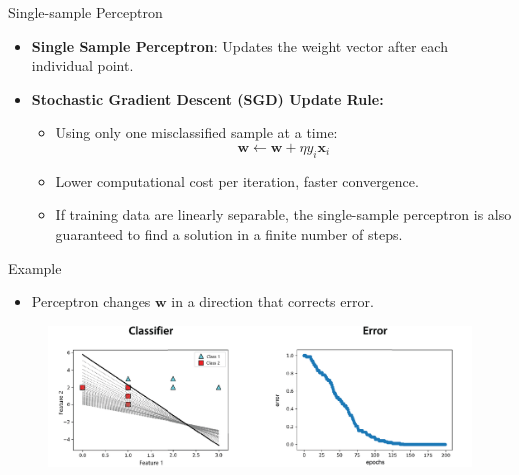 \documentclass[serif, aspectratio=169]{beamer}
\begin{document}
\begin{frame}{Single-sample Perceptron}
    \begin{itemize}\itemsep1.5em
        \item \justifying \textbf{Single Sample Perceptron}: Updates the weight vector after each individual point.
        \item \textbf{Stochastic Gradient Descent (SGD) Update Rule:}
        \smallskip
        \begin{itemize}\itemsep1em
            \item Using only one misclassified sample at a time:
            \[
            \mathbf{w} \leftarrow \mathbf{w} + \eta y_i \mathbf{x}_i
            \]
            \item Lower computational cost per iteration, faster convergence.
            \item \justifying If training data are linearly separable, the single-sample perceptron is also guaranteed to find a solution in a finite number of steps.
        \end{itemize}
    \end{itemize}
\end{frame}

\begin{frame}{Example}
    \begin{itemize}
        \item Perceptron changes \(\mathbf{w}\) in a direction that corrects error.
    \end{itemize}
    \begin{figure}
        \centering
        \includegraphics[width=\linewidth]{pic/Figure_14.png}
    \end{figure}
\end{frame}
\end{document}
